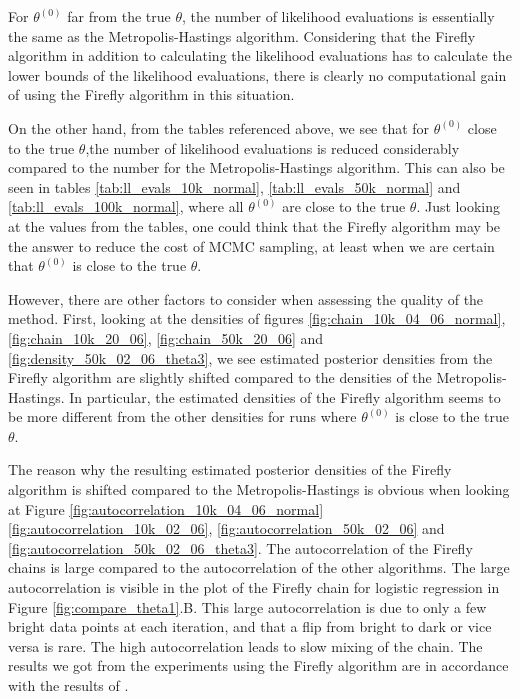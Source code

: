  
For $\theta^{\left(0\right)}$ far from the true $\theta$, the number of likelihood evaluations is essentially the same as the Metropolis-Hastings algorithm.
Considering that the Firefly algorithm in addition to calculating the likelihood evaluations has to calculate the lower bounds of the likelihood evaluations, there is clearly no computational gain of using the Firefly algorithm in this situation.

On the other hand, from the tables referenced above, we see that for $\theta^{\left(0\right)}$ close to the true $\theta$,the number of likelihood evaluations is reduced considerably compared to the number for the Metropolis-Hastings algorithm. 
This can also be seen in tables \ref{tab:ll_evals_10k_normal}, \ref{tab:ll_evals_50k_normal} and \ref{tab:ll_evals_100k_normal}, where all $\theta^{\left(0\right)}$ are close to the true $\theta$. Just looking at the values from the tables, one could think that the Firefly algorithm may be the answer to reduce the cost of MCMC sampling, at least when we are certain that $\theta^{\left(0\right)}$ is close to the true $\theta$. 

However, there are other factors to consider when assessing the quality of the method. First, looking at the densities of figures \ref{fig:chain_10k_04_06_normal}, \ref{fig:chain_10k_20_06}, \ref{fig:chain_50k_20_06} and \ref{fig:density_50k_02_06_theta3}, we see estimated posterior densities from the Firefly algorithm are slightly shifted compared to the densities of the Metropolis-Hastings.
In particular, the estimated densities of the Firefly algorithm seems to be more different from the other densities for runs where $\theta^{\left(0\right)}$ is close to the true $\theta$. 

The reason why the resulting estimated posterior densities of the Firefly algorithm is shifted compared to the Metropolis-Hastings is obvious when looking at Figure
\ref{fig:autocorrelation_10k_04_06_normal}\ref{fig:autocorrelation_10k_02_06}, \ref{fig:autocorrelation_50k_02_06} and  \ref{fig:autocorrelation_50k_02_06_theta3}. The autocorrelation of the Firefly chains is large compared to the autocorrelation of the other algorithms. The large autocorrelation is visible in the plot of the Firefly chain for logistic regression in Figure \ref{fig:compare_theta1}.B. This large autocorrelation is due to only a few bright data points at each iteration, and that a flip from bright to dark or vice versa is rare. The high autocorrelation leads to slow mixing of the chain. The results we got from the experiments using the Firefly algorithm are in accordance with the results of \cite{Bardenet:1}.  

